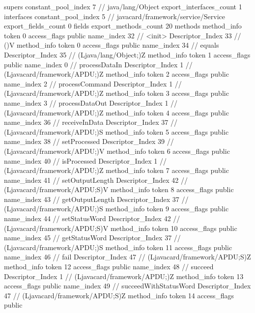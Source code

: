 {{{			supers {
				constant_pool_index	7		// java/lang/Object
			}
			export_interfaces_count	1
			interfaces {
				constant_pool_index	5		// javacard/framework/service/Service
			}
			export_fields_count	0
			fields {
			}
			export_methods_count	20
			methods {
				method_info {
					token	0
					access_flags	public
					name_index	32		// <init>
					Descriptor_Index	33		// ()V
				}
				method_info {
					token	0
					access_flags	public
					name_index	34		// equals
					Descriptor_Index	35		// (Ljava/lang/Object;)Z
				}
				method_info {
					token	1
					access_flags	public
					name_index	0		// processDataIn
					Descriptor_Index	1		// (Ljavacard/framework/APDU;)Z
				}
				method_info {
					token	2
					access_flags	public
					name_index	2		// processCommand
					Descriptor_Index	1		// (Ljavacard/framework/APDU;)Z
				}
				method_info {
					token	3
					access_flags	public
					name_index	3		// processDataOut
					Descriptor_Index	1		// (Ljavacard/framework/APDU;)Z
				}
				method_info {
					token	4
					access_flags	public
					name_index	36		// receiveInData
					Descriptor_Index	37		// (Ljavacard/framework/APDU;)S
				}
				method_info {
					token	5
					access_flags	public
					name_index	38		// setProcessed
					Descriptor_Index	39		// (Ljavacard/framework/APDU;)V
				}
				method_info {
					token	6
					access_flags	public
					name_index	40		// isProcessed
					Descriptor_Index	1		// (Ljavacard/framework/APDU;)Z
				}
				method_info {
					token	7
					access_flags	public
					name_index	41		// setOutputLength
					Descriptor_Index	42		// (Ljavacard/framework/APDU;S)V
				}
				method_info {
					token	8
					access_flags	public
					name_index	43		// getOutputLength
					Descriptor_Index	37		// (Ljavacard/framework/APDU;)S
				}
				method_info {
					token	9
					access_flags	public
					name_index	44		// setStatusWord
					Descriptor_Index	42		// (Ljavacard/framework/APDU;S)V
				}
				method_info {
					token	10
					access_flags	public
					name_index	45		// getStatusWord
					Descriptor_Index	37		// (Ljavacard/framework/APDU;)S
				}
				method_info {
					token	11
					access_flags	public
					name_index	46		// fail
					Descriptor_Index	47		// (Ljavacard/framework/APDU;S)Z
				}
				method_info {
					token	12
					access_flags	public
					name_index	48		// succeed
					Descriptor_Index	1		// (Ljavacard/framework/APDU;)Z
				}
				method_info {
					token	13
					access_flags	public
					name_index	49		// succeedWithStatusWord
					Descriptor_Index	47		// (Ljavacard/framework/APDU;S)Z
				}
				method_info {
					token	14
					access_flags	public
}}}}}
